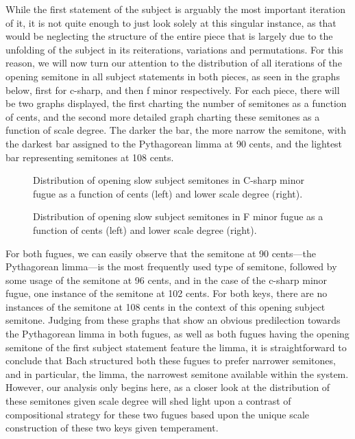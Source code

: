     While the first statement of the subject is arguably the most important
iteration of it, it is not quite enough to just look solely at this
singular instance, as that would be neglecting the structure of the
entire piece that is largely due to the unfolding of the subject in its
reiterations, variations and permutations. For this reason, we will now
turn our attention to the distribution of all iterations of the opening
semitone in all subject statements in both pieces, as seen in the graphs
below, first for c-sharp, and then f minor respectively. For each piece,
there will be two graphs displayed, the first charting the number of
semitones as a function of cents, and the second more detailed graph
charting these semitones as a function of scale degree. The darker the
bar, the more narrow the semitone, with the darkest bar assigned to the
Pythagorean limma at 90 cents, and the lightest bar representing
semitones at 108 cents.



\begin{figure}[H]
\vspace{1.5em}
    \centering
    \caption[Distribution of opening slow subject semitones in C-sharp minor fugue as a function of cents and lower scale degree. ]{Distribution of opening slow subject semitones in C-sharp minor fugue as a function of cents (left) and lower scale degree (right).}
\end{figure}

\begin{figure}[H]
\vspace{1.5em}
    \centering
    \caption[Distribution of opening slow subject semitones in F minor fugue as a function of cents and lower scale degree. ]{Distribution of opening slow subject semitones in F minor fugue as a function of cents (left) and lower scale degree (right).}
\end{figure}    For both fugues, we can easily observe that the semitone at 90
cents---the Pythagorean limma---is the most frequently used type
of semitone, followed by some usage of the semitone at 96 cents, and in
the case of the c-sharp minor fugue, one instance of the semitone at 102
cents. For both keys, there are no instances of the semitone at 108
cents in the context of this opening subject semitone. Judging from
these graphs that show an obvious predilection towards the Pythagorean
limma in both fugues, as well as both fugues having the opening semitone
of the first subject statement feature the limma, it is straightforward
to conclude that Bach structured both these fugues to prefer narrower
semitones, and in particular, the limma, the narrowest semitone
available within the system. However, our analysis only begins here, as
a closer look at the distribution of these semitones given scale degree
will shed light upon a contrast of compositional strategy for these two
fugues based upon the unique scale construction of these two keys given
temperament.

